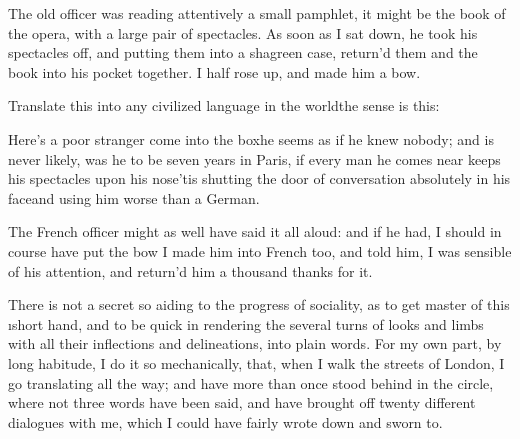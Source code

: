 \documentclass[twoside]{article}
\begin{document}
The old officer was reading attentively a small pamphlet, it might be the
book of the opera, with a large pair of spectacles.  As soon as I sat
down, he took his spectacles off, and putting them into a shagreen case,
return’d them and the book into his pocket together.  I half rose up, and
made him a bow.

Translate this into any civilized language in the world\tsk the sense is
this:

\lqq Here’s a poor stranger come into the box\tsk he seems as if he knew nobody;
and is never likely, was he to be seven years in Paris, if every man he
comes near keeps his spectacles upon his nose\tsk ’tis shutting the door of
conversation absolutely in his face\tsk and using him worse than a German.\rqq

The French officer might as well have said it all aloud: and if he had, I
should in course have put the bow I made him into French too, and told
him, \lqq I was sensible of his attention, and return’d him a thousand thanks
for it.\rqq

There is not a secret so aiding to the progress of sociality, as to get
master of this \i{short hand}, and to be quick in rendering the several
turns of looks and limbs with all their inflections and delineations,
into plain words.  For my own part, by long habitude, I do it so
mechanically, that, when I walk the streets of London, I go translating
all the way; and have more than once stood behind in the circle, where
not three words have been said, and have brought off twenty different
dialogues with me, which I could have fairly wrote down and sworn to.
\end{document}
